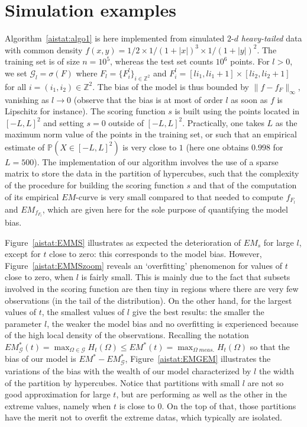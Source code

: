 \section{Simulation examples}
\label{aistat:sec:simul}
Algorithm~\ref{aistat:algo1} is here implemented from simulated $2$-$d$ \textit{heavy-tailed} data  with common density
$f(x,y)=1/2 \times 1/(1+|x|)^3\times 1/(1+|y|)^2$. The training set is of size $n=10^5$, whereas the test set counts $10^6$ points.
For $l>0$, we set $\mathcal{G}_l=\sigma(F)$ where $F_l=\{F_i^l\}_{i\in \mathbb{Z}^2}$ and $F_i^l = [l i_1,l i_1+1]\times[l i_2,l i_2+1]$ for all $i=(i_1,i_2) \in \mathbb{Z}^2$. The bias of the model is thus bounded by $\|f-f_{F}\|_{\infty}$, vanishing as $l \rightarrow 0$ (observe that the bias is at most of order $l$ as soon as $f$ is Lipschitz for instance). The scoring function $s$ is built using the points located in $[-L,L]^2$ and setting $s=0$ outside of $[-L,L]^2$. Practically, one takes $L$ as the maximum norm value of the points in the training set, or such that an empirical estimate of $\mathbb{P}(X \in [-L,L]^2)$ is very close to $1$ (here one obtains $0.998$ for $L=500$). 
The implementation of our algorithm involves the use of a sparse matrix to store the data in the partition of hypercubes, such that the complexity of the procedure for building the scoring function $s$ and that of the computation of its empirical $EM$-curve is very small compared to that needed to compute $f_{F_l}$ and $EM_{f_{F_l}}$, which are given here for the sole purpose of quantifying the model bias.

Figure~\ref{aistat:EMMS} illustrates as expected the deterioration of $EM_s$ for large $l$, except for $t$ close to zero: this corresponds to the model bias. However, Figure~\ref{aistat:EMMSzoom} reveals an `overfitting' phenomenon for values of $t$ close to zero, when $l$ is fairly small. 
This is mainly due to the fact that subsets involved in the scoring function are then tiny in regions where there are very few observations (in the tail of the distribution). On the other hand, for the largest values of $t$, the smallest values of $l$ give the best results: the smaller the parameter $l$, the weaker the model bias and no overfitting is experienced because of the high local density of the observations.
Recalling the notation $EM_{\mathcal{G}}^*(t)=\max_{\Omega \in \mathcal{G}}H_t(\Omega) \le EM^*(t)=\max_{\Omega\; meas.}H_t(\Omega)$ so that the bias of our model is $EM^*-EM^*_{\mathcal{G}}$, Figure~\ref{aistat:EMGEM} illustrates the variations of the bias with the wealth of our model characterized by $l$ the width of the partition by hypercubes. Notice that partitions with small $l$ are not so good approximation for large $t$, but are performing as well as the other in the extreme values, namely when $t$ is close to $0$. On the top of that, those partitions have the merit not to overfit the extreme datas, which typically are isolated.
 
